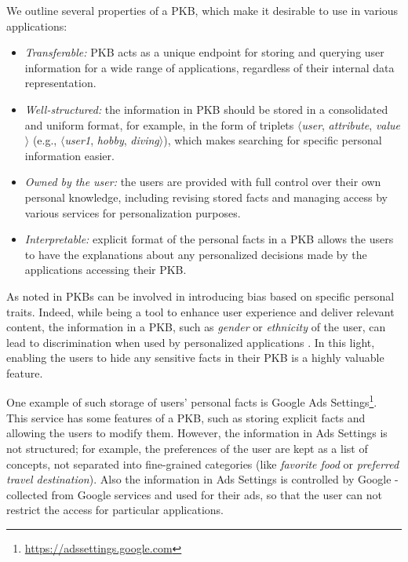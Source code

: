 We outline several properties of a PKB, which make it desirable to use in various applications:
\begin{itemize}
    \item \textit{Transferable:} PKB acts as a unique endpoint for storing and querying user information for a wide range of applications, regardless of their internal data representation.
    \item \textit{Well-structured:} the information in PKB should be stored in a consolidated and uniform format, for example, in the form of triplets $\langle$\textit{user}, \textit{attribute}, \textit{value}$\rangle$ (e.g., $\langle$\textit{user1}, \textit{hobby}, \textit{diving}$\rangle$), which makes searching for specific personal information easier.
    \item \textit{Owned by the user:} the users are provided with full control over their own personal knowledge, including revising stored facts and managing access by various services for personalization purposes.
    \item \textit{Interpretable:} explicit format of the personal facts in a PKB allows the users to have the explanations about any personalized decisions made by the applications accessing their PKB.
\end{itemize}

As noted in \citet{gerritse2020bias} PKBs can be involved in introducing bias based on specific personal traits. Indeed, while being a tool to enhance user experience and deliver relevant content, the information in a PKB, such as \textit{gender} or \textit{ethnicity} of the user, can lead to discrimination when used by personalized applications \cite{datta2015automated,  ali2019discrimination}. In this light, enabling the users to hide any sensitive facts in their PKB is a highly valuable feature.

One example of such storage of users' personal facts is Google Ads Settings\footnote{\url{https://adssettings.google.com}}. This service has some features of a PKB, such as storing explicit facts and allowing the users to modify them. However, the information in Ads Settings is not structured; for example, the preferences of the user are kept as a list of concepts, not separated into fine-grained categories (like \textit{favorite food} or \textit{preferred travel destination}). Also the information in Ads Settings is controlled by Google - collected from Google services and used for their ads, so that the user can not restrict the access for particular applications. %

